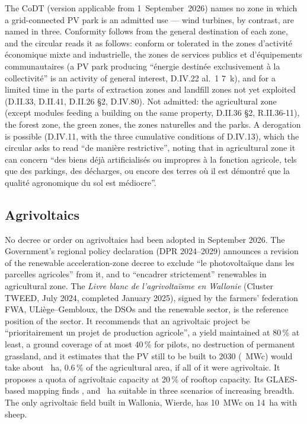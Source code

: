 \documentclass[11pt,a4paper]{article}
\begin{document}
The CoDT (version applicable from 1~September~2026) names no zone in which a
grid-connected PV park is an admitted use --- wind turbines, by contrast, are
named in three. Conformity follows from the general destination of each zone,
and the circular reads it as follows: conform or tolerated in the zones
d'activité économique mixte and industrielle, the zones de services publics et
d'équipements communautaires (a PV park producing ``énergie destinée
exclusivement à la collectivité'' is an activity of general interest, D.IV.22
al.~1 7\textdegree{}~k), and for a limited time in the parts of extraction zones and landfill
zones not yet exploited (D.II.33, D.II.41, D.II.26 \S{}2, D.IV.80). Not admitted:
the agricultural zone (except modules feeding a building on the same property,
D.II.36 \S{}2, R.II.36-11), the forest zone, the green zones, the zones naturelles
and the parks. A derogation is possible (D.IV.11, with the three cumulative
conditions of D.IV.13), which the circular asks to read ``de manière
restrictive'', noting that in agricultural zone it can concern ``des biens déjà
artificialisés ou impropres à la fonction agricole, tels que des parkings, des
décharges, ou encore des terres où il est démontré que la qualité agronomique du
sol est médiocre''.

\subsection{Agrivoltaics}

No decree or order on agrivoltaics had been adopted in September 2026. The
Government's regional policy declaration (DPR 2024--2029) announces a revision of
the renewable acceleration-zone decree to exclude ``le photovoltaïque dans les
parcelles agricoles'' from it, and to ``encadrer strictement'' renewables in
agricultural zone. The \emph{Livre blanc de l'agrivoltaïsme en Wallonie}
(Cluster TWEED, July 2024, completed January 2025), signed by the farmers'
federation FWA, ULiège--Gembloux, the DSOs and the renewable sector, is the
reference position of the sector. It recommends that an agrivoltaic project be
``prioritairement un projet de production agricole'', a yield maintained at
80\,\% at least, a ground coverage of at most 40\,\% for pilots, no destruction
of permanent grassland, and it estimates that the PV still to be built to 2030
(\LbRemainingMW{}~MWc) would take about \LbRemainingHa{}~ha, 0.6\,\% of the
agricultural area, if all of it were agrivoltaic. It proposes a quota of
agrivoltaic capacity at 20\,\% of rooftop capacity. Its GLAES-based mapping
finds \GlaesOneHa{}, \GlaesTwoHa{} and \GlaesThreeHa{}~ha suitable in three
scenarios of increasing breadth. The only agrivoltaic field built in Wallonia,
Wierde, has 10~MWc on 14~ha with sheep.
\end{document}
